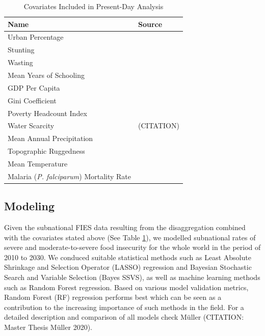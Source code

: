 \documentclass{article}
\begin{document}
\begin{table}[H]
	\begin{tabular}{ll}
		\toprule
		Name & Source \\
		\midrule
		Urban Percentage & \citep{Jones2016} \\
		Stunting & \citep{Local2020} \\
		Wasting & \citep{Local2020} \\
		Mean Years of Schooling & \citep{Smits2019, KC2017} \\
		GDP Per Capita & \citep{Smits2019, Dellink2017} \\
		Gini Coefficient & \citep{Rao2019a} \\
    Poverty Headcount Index & \citep{Cuaresma2018} \\
		Water Scarcity & (CITATION) \\
		Mean Annual Precipitation &  \cite{abatzoglou2018terraclimate, warszawski2014inter} \\
		Topographic Ruggedness &  \cite{USGS1996, Riley1999} \\
		Mean Temperature &  \cite{abatzoglou2018terraclimate, warszawski2014inter} \\
		Malaria (\textit{P. falciparum}) Mortality Rate &  \cite{Weiss2019} \\
		\bottomrule
	\end{tabular}
	\caption{Covariates Included in Present-Day Analysis}
	\label{tab:covars}
\end{table}


\subsection{Modeling}

Given the subnational FIES data resulting from the disaggregation combined with the covariates stated above (See Table \ref{tab:covars}), we modelled subnational rates of severe and moderate-to-severe food insecurity for the whole world in the period of 2010 to 2030. We conduced suitable statistical methods such as Least Absolute Shrinkage and Selection Operator (LASSO) regression and Bayesian Stochastic Search and Variable Selection (Bayes SSVS), as well as machine learning methods such as Random Forest regression. Based on various model validation metrics, Random Forest (RF) regression performs best which can be seen as a contribution to the increasing importance of such methods in the field. For a detailed description and comparison of all models check M\"uller (CITATION: Master Thesis M\"uller 2020).
\end{document}
